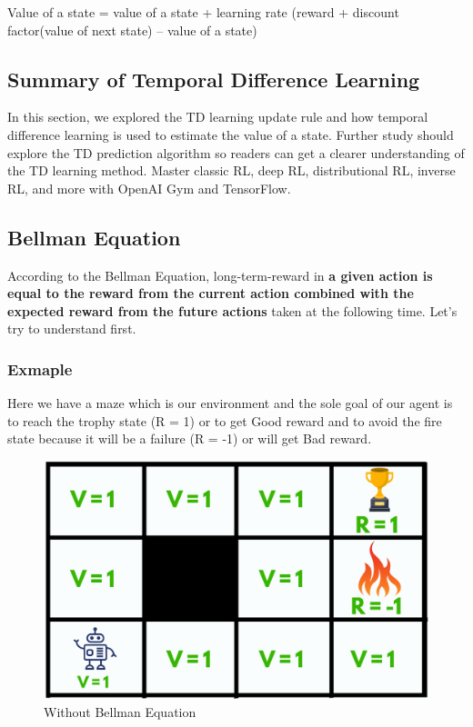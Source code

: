 Value of a state = value of a state + learning rate (reward + discount factor(value 
of next state) – value of a state)  


\subsection{Summary of Temporal Difference Learning}

In this section, we explored the TD learning update rule and how temporal 
difference learning is used to estimate the value of a state. Further study 
should explore the TD prediction algorithm so readers can get a clearer 
understanding of the TD learning method. Master classic RL, deep RL, 
distributional RL, inverse RL, and more with OpenAI Gym and TensorFlow. 

\subsection{Bellman Equation}


According to the Bellman Equation, long-term-reward in {\bf a given action is equal 
to the reward from the current action combined with the expected reward from the 
future actions} taken at the following time. Let's try to understand first.

\subsubsection{Exmaple}

Here we have a maze which is our environment and the sole goal of our agent is to 
reach the trophy state (R = 1) or to get Good reward and to avoid the fire state 
because it will be a failure (R = -1) or will get Bad reward.

\begin{figure}[!htb]
\centering
\includegraphics[scale=0.3]{pix/maze.png}
\caption{Without Bellman Equation}
\end{figure}

